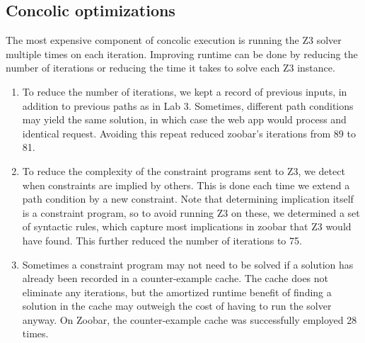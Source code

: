 \documentclass{scrartcl}
\begin{document}
\subsection{Concolic optimizations}

The most expensive component of concolic execution is running the Z3
solver multiple times on each iteration. Improving runtime can be done
by reducing the number of iterations or reducing the time it takes to
solve each Z3 instance.

\begin{enumerate}
\item To reduce the number of iterations, we kept a record of previous
  inputs, in addition to previous paths as in Lab 3. Sometimes,
  different path conditions may yield the same solution, in which case
  the web app would process and identical request. Avoiding this
  repeat reduced zoobar's iterations from 89 to 81.

\item To reduce the complexity of the constraint programs sent to Z3,
  we detect when constraints are implied by others. This is done each
  time we extend a path condition by a new constraint. Note that
  determining implication itself is a constraint program, so to avoid
  running Z3 on these, we determined a set of syntactic rules, which
  capture most implications in zoobar that Z3 would have found. This
  further reduced the number of iterations to 75.

\item Sometimes a constraint program may not need to be solved if a
  solution has already been recorded in a counter-example cache. The
  cache does not eliminate any iterations, but the amortized runtime
  benefit of finding a solution in the cache may outweigh the cost of
  having to run the solver anyway. On Zoobar, the counter-example
  cache was successfully employed 28 times.
\end{enumerate}
\end{document}
